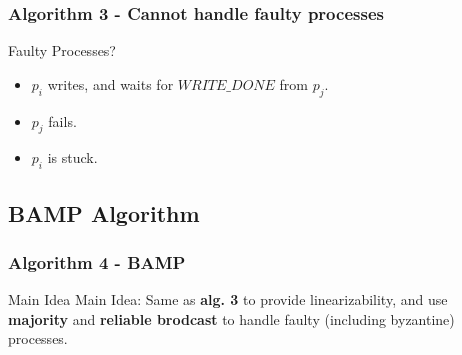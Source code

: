 \begin{frame}
    \frametitle{Algorithm 3 - Cannot handle faulty processes}
    \begin{center}
        \begin{alertblock}{Faulty Processes?}
            \begin{itemize}
                \item $p_i$ writes, and waits for $WRITE\_DONE$ from $p_j$.
                \item $p_j$ fails.
                \item $p_i$ is stuck.
            \end{itemize}
        \end{alertblock}
    \end{center}
\end{frame}

\subsection{BAMP Algorithm}

\begin{frame}
    \frametitle{Algorithm 4 - BAMP}
    \begin{block}{Main Idea}
        Main Idea: Same as \textbf{alg. 3} to provide linearizability,
        and use \textbf{majority} and \textbf{reliable brodcast} to handle faulty (including byzantine) processes.
    \end{block}
\end{frame}

